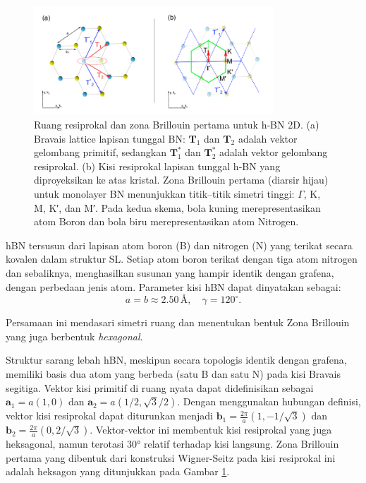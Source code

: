 \begin{figure}[ht]
    \centering
    \includegraphics[width=0.8\textwidth]{gambar/hBN_structure_brillouinzone}
    \caption{Ruang resiprokal dan zona Brillouin pertama untuk h‑BN 2D.
(a) Bravais lattice lapisan tunggal BN: $\mathbf{T}_1$ dan $\mathbf{T}_2$ adalah vektor gelombang primitif, sedangkan $\mathbf{T}_1^*$ dan $\mathbf{T}_2^*$ adalah vektor gelombang resiprokal.
(b) Kisi resiprokal lapisan tunggal h‑BN yang diproyeksikan ke atas kristal.
Zona Brillouin pertama (diarsir hijau) untuk monolayer BN menunjukkan titik–titik simetri tinggi: $\Gamma$, K, M, K′, dan M′.
Pada kedua skema, bola kuning merepresentasikan atom Boron dan bola biru merepresentasikan atom Nitrogen.
\cite{elias2020}}
    \label{fig:reciprocal_bz_hbn}
\end{figure}

hBN tersusun dari lapisan atom boron (B) dan nitrogen (N) yang terikat secara kovalen dalam struktur  SL. Setiap atom boron terikat dengan tiga atom nitrogen dan sebaliknya, menghasilkan susunan yang hampir identik dengan grafena, dengan perbedaan jenis atom. Parameter kisi hBN dapat dinyatakan sebagai:
\begin{equation}
a = b \approx 2.50 \, \text{\AA}, \quad \gamma = 120^\circ.
\end{equation}

Persamaan ini mendasari simetri ruang dan menentukan bentuk Zona Brillouin yang juga berbentuk \emph{hexagonal}.

Struktur sarang lebah hBN, meskipun secara topologis identik dengan grafena, memiliki basis dua atom yang berbeda (satu B dan satu N) pada kisi Bravais segitiga. Vektor kisi primitif di ruang nyata dapat didefinisikan sebagai $\mathbf{a}_1 = a(1, 0)$ dan $\mathbf{a}_2 = a(1/2, \sqrt{3}/2)$. Dengan menggunakan hubungan definisi, vektor kisi resiprokal dapat diturunkan menjadi $\mathbf{b}_1 = \frac{2\pi}{a}(1, -1/\sqrt{3})$ dan $\mathbf{b}_2 = \frac{2\pi}{a}(0, 2/\sqrt{3})$. Vektor-vektor ini membentuk kisi resiprokal yang juga heksagonal, namun terotasi 30° relatif terhadap kisi langsung. Zona Brillouin pertama yang dibentuk dari konstruksi Wigner-Seitz pada kisi resiprokal ini adalah heksagon yang ditunjukkan pada Gambar \ref{fig:reciprocal_bz_hbn}.

